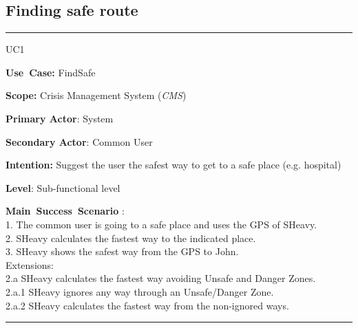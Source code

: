 \subsection{Finding safe route}
\vspace{0.5cm}
\hrule
\vspace{0.5cm}
\begin{lyxlist}{UC1}
\small{
\item [\textbf{Use~Case:}] FindSafe
\item [\textbf{Scope:}] Crisis Management System (\emph{CMS})
\item [\textbf{Primary Actor}:] System
\item [\textbf{Secondary Actor}:] Common User
\item [\textbf{Intention:}]Suggest the user the safest way to get to a safe
place (e.g. hospital)
\item [\textbf{Level}:]Sub-functional level
\item [\textbf{Main~Success~Scenario}]:\\
1. The common user is going to a safe place and uses the GPS of SHeavy.\\
2. SHeavy calculates the fastest way to the indicated place.\\
3. SHeavy shows the safest way from the GPS to John.\\
Extensions:\\
2.a SHeavy calculates the fastest way avoiding Unsafe and Danger Zones.\\
	2.a.1 SHeavy ignores any way through an Unsafe/Danger Zone.\\
	2.a.2 SHeavy calculates the fastest way from the non-ignored ways.\\
\item 
}
\end{lyxlist}
\hrule
\vspace{0.5cm}  
















